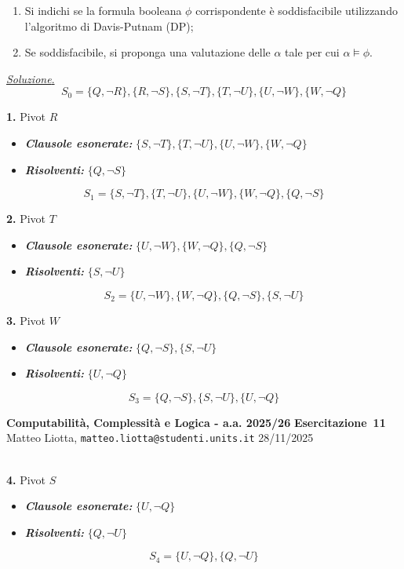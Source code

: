 \documentclass[a4paper,10pt]{article}
\makeatletter
\newcommand{\EsercitazioneNum}{11}
\newcommand{\Data}{28/11/2025}
\newcommand{\DocType}{Esercitazione} %
\newcommand{\FullTitle}{\DocType\ \EsercitazioneNum}
\newcommand{\Header}{
\noindent
  \small \textbf{Computabilità, Complessità e Logica - a.a. 2025/26} \hfill \textbf{\FullTitle} \\[0.2cm]
  \scriptsize Matteo Liotta, \texttt{matteo.liotta@studenti.units.it} \hfill \Data \\[0.2cm]
  \noindent\makebox[\linewidth]{\rule{\linewidth}{0.4pt}} \\[0.3cm]}
\newcommand{\NewPageHeader}{
  \vfill
  \noindent\makebox[\linewidth]{\rule{\linewidth}{0.4pt}}
  \newpage
  {\Header}
}
\makeatother
\begin{document}
{\begin{itemize}[label=, leftmargin=0pt]
    \begin{enumerate}
        \item Si indichi se la formula booleana $\phi$ corrispondente è soddisfacibile utilizzando l'algoritmo di Davis-Putnam (DP);
        \item Se soddisfacibile, si proponga una valutazione delle  $\alpha$ tale per cui $\alpha\models\phi$.
    \end{enumerate}

    \begin{osservazioni}
    \underline{\textit{Soluzione}.}\\
    $$S_0 = \{Q,\lnot R\}, \{R,\lnot S\},\{S,\lnot T\},\{T,\lnot U\},\{U,\lnot W\},\{W,\lnot Q\}$$
    
    \textbf{1.} Pivot $R$
    \begin{itemize}
        \item \textbf{\textit{Clausole esonerate:}} $\{S,\lnot T\},\{T,\lnot U\},\{U,\lnot W\},\{W,\lnot Q\}$
        \item \textbf{\textit{Risolventi:}} $\{Q,\lnot S\}$
    \end{itemize}
    $$S_1 = \{S,\lnot T\},\{T,\lnot U\},\{U,\lnot W\},\{W,\lnot Q\}, \{Q,\lnot S\}$$
    
    \textbf{2.} Pivot $T$
    \begin{itemize}
        \item \textbf{\textit{Clausole esonerate:}} $\{U,\lnot W\},\{W,\lnot Q\}, \{Q,\lnot S\}$
        \item \textbf{\textit{Risolventi:}} $\{S,\lnot U\}$
    \end{itemize}
    $$S_2= \{U,\lnot W\},\{W,\lnot Q\}, \{Q,\lnot S\},\{S,\lnot U\}$$

    
    \textbf{3.} Pivot $W$
    \begin{itemize}
        \item \textbf{\textit{Clausole esonerate:}} $\{Q,\lnot S\},\{S,\lnot U\}$
        \item \textbf{\textit{Risolventi:}} $\{U,\lnot Q\}$
    \end{itemize}
    $$S_3 = \{Q,\lnot S\},\{S,\lnot U\},\{U,\lnot Q\}$$
    \end{osservazioni}
    \NewPageHeader

\begin{osservazioni}
    \textbf{4.} Pivot $S$
    \begin{itemize}
        \item \textbf{\textit{Clausole esonerate:}} $\{U,\lnot Q\}$
        \item \textbf{\textit{Risolventi:}} $\{Q,\lnot U\}$
    \end{itemize}
    $$S_4 = \{U,\lnot Q\},\{Q,\lnot U\}$$


\end{osservazioni}
\end{itemize}}
\end{document}
